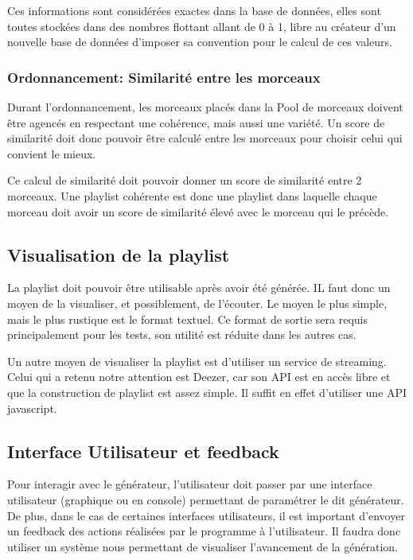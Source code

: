 Ces informations sont considérées exactes dans la base de données, elles sont 
toutes stockées dans des nombres flottant allant de 0 à 1, 
libre au créateur d'un nouvelle base de données d'imposer sa convention pour le calcul de ces valeurs.

\subsubsection{Ordonnancement: Similarité entre les morceaux}
\label{besoins:fonc:generation:selection:ordonnancement}

Durant l'ordonnancement, les morceaux placés dans la Pool de morceaux doivent être 
agencés en respectant une cohérence, mais aussi une variété. 
Un score de similarité doit donc pouvoir être calculé entre les morceaux pour 
choisir celui qui convient le mieux.

Ce calcul de similarité doit pouvoir donner un score de similarité entre 2 morceaux. 
Une playlist cohérente est donc une playlist dans laquelle chaque morceau doit 
avoir un score de similarité élevé avec le morceau qui le précède.

\subsection{Visualisation de la playlist}
\label{besoins:fonc:generation:visu}

La playlist doit pouvoir être utilisable après avoir été générée. IL faut donc un
moyen de la visualiser, et possiblement, de l’écouter.
Le moyen le plus simple, mais le plus rustique est le format textuel. Ce format
de sortie sera requis principalement pour les tests, son utilité est réduite dans
les autres cas.

Un autre moyen de visualiser la playlist est d’utiliser un service de streaming.
Celui qui a retenu notre attention est Deezer, car son API est en accès libre et
que la construction de playlist est assez simple. Il suffit en effet d’utiliser
une API javascript.
        
\subsection{Interface Utilisateur et feedback}
\label{besoins:fonc:generation:feedback}

Pour interagir avec le générateur, l’utilisateur doit passer par une interface
utilisateur (graphique ou en console) permettant de paramétrer le dit générateur.
De plus, dans le cas de certaines interfaces utilisateurs, il est important
d’envoyer un feedback des actions réalisées par le programme à l’utilisateur. Il
faudra donc utiliser un système nous permettant de visualiser l’avancement de la
génération.

